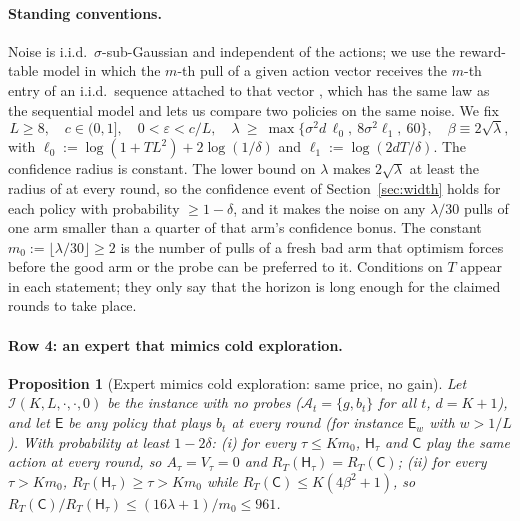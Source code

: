 \documentclass{article}
\newtheorem{proposition}{Proposition}
\theoremstyle{definition}
\theoremstyle{remark}
\newcommand{\eps}{\varepsilon}
\theoremstyle{remark}
\newcommand{\Cold}{\mathsf{C}}
\newcommand{\Exp}{\mathsf{E}}
\newcommand{\Hyb}{\mathsf{H}}
\begin{document}
\paragraph{Standing conventions.}
Noise is i.i.d.\ $\sigma$-sub-Gaussian and independent of the actions; we use
the reward-table model in which the $m$-th pull of a given action vector
receives the $m$-th entry of an i.i.d.\ sequence attached to that vector
\cite[\S4.6]{lattimore2020bandit}, which has the same law as the sequential
model and lets us compare two policies on the same noise. We fix
\begin{equation}
\label{eq:conventions}
L\ge8,\quad c\in(0,1],\quad 0<\eps<c/L,\quad
\lambda\ \ge\ \max\bigl\{\sigma^2d\,\ell_0,\ 8\sigma^2\ell_1,\ 60\bigr\},\quad
\beta\equiv2\sqrt\lambda,
\end{equation}
with $\ell_0:=\log(1+TL^2)+2\log(1/\delta)$ and $\ell_1:=\log(2dT/\delta)$.
The confidence radius is constant. The lower bound on $\lambda$ makes
$2\sqrt\lambda$ at least the radius of \cite{abbasi2011improved} at every
round, so the confidence event of Section~\ref{sec:width} holds for each
policy with probability $\ge1-\delta$, and it makes the noise on any $\lambda/30$
pulls of one arm smaller than a quarter of that arm's confidence bonus. The
constant $m_0:=\lfloor\lambda/30\rfloor\ge2$ is the number of pulls of a
fresh bad arm that optimism forces before the good arm or the probe can be
preferred to it. Conditions on $T$ appear in each statement; they only say
that the horizon is long enough for the claimed rounds to take place.


\paragraph{Row 4: an expert that mimics cold exploration.}
\begin{proposition}[Expert mimics cold exploration: same price, no gain]
\label{prop:cat-mimic}
Let $\mathcal I(K,L,\cdot,\cdot,0)$ be the instance with no probes
($\mathcal A_t=\{g,b_t\}$ for all $t$, $d=K+1$), and let $\Exp$ be any policy
that plays $b_t$ at every round (for instance $\Exp_w$ with $w>1/L$). With
probability at least $1-2\delta$: (i) for every $\tau\le Km_0$,
$\Hyb_\tau$ and $\Cold$ play the same action at every round, so
$A_\tau=V_\tau=0$ and $R_T(\Hyb_\tau)=R_T(\Cold)$; (ii) for every
$\tau>Km_0$, $R_T(\Hyb_\tau)\ge\tau>Km_0$ while $R_T(\Cold)\le K(4\beta^2+1)$,
so $R_T(\Cold)/R_T(\Hyb_\tau)\le(16\lambda+1)/m_0\le961$.
\end{proposition}
\end{document}
